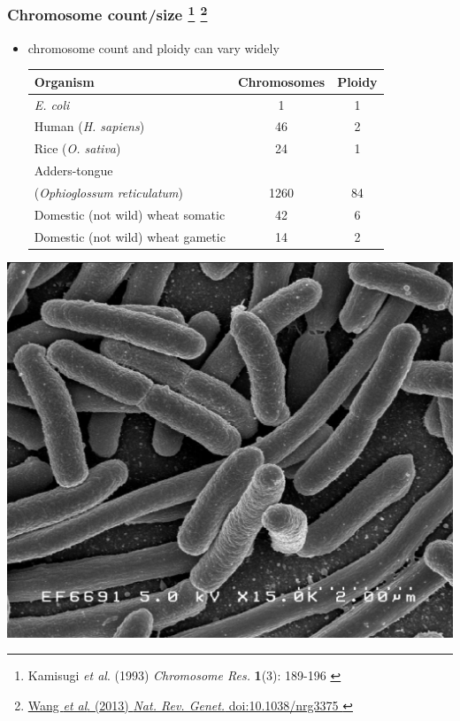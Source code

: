 %
\begin{frame}
  \frametitle{Chromosome count/size
    \footnote{\tiny{Kamisugi \textit{et al}. (1993) \textit{Chromosome Res.} \textbf{1}(3): 189-196
}}
    \footnote{\tiny{\href{http://dx.doi.org/10.1038/nrg3375
}{Wang \textit{et al}. (2013) \textit{Nat. Rev. Genet.} doi:10.1038/nrg3375
}}}
  }
    \begin{itemize}
      \item \textcolor{hutton_green}{chromosome count and ploidy can vary widely} \\
        \begin{table}
		  \begin{tabular}{l | c | c }
		    Organism & Chromosomes & Ploidy  \\
			\hline \hline
			\textit{E. coli} & 1 & 1  \\ 
			Human (\textit{H. sapiens}) & 46 & 2 \\
			\hline
			Rice (\textit{O. sativa}) & 24 & 1  \\
			Adders-tongue & & \\ 
			(\textit{Ophioglossum reticulatum}) & 1260 & 84 \\
			\hline
			Domestic (not wild) wheat somatic & 42 & 6 \\
			Domestic (not wild) wheat gametic & 14 & 2 \\			
		  \end{tabular}
		\end{table}
	\end{itemize}
  \begin{center}
    \includegraphics[height=0.15\textheight]{images/EscherichiaColi_NIAID}

\end{center}
\end{frame}
